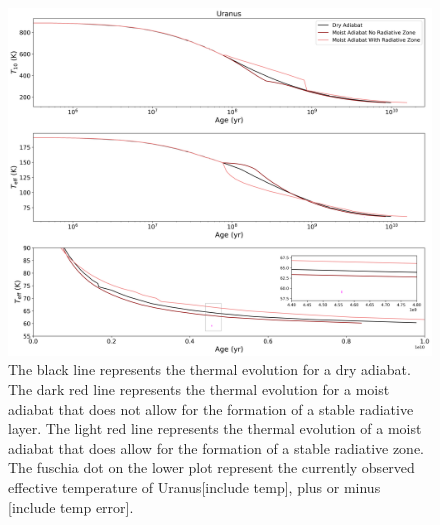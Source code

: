 \documentclass[11pt]{ucscthesisbs}
\begin{document}
\begin{figure}[ht]
 \centerline{
  \includegraphics[scale=0.5]{figures/dry_moist_radiative_u_cooling_curves_adiabat_comparisons.png}
 }
\caption[Thermal Evolution Curves for Uranus - Adiabat Comparisons]
{The black line represents the thermal evolution for a dry adiabat. The dark red line represents the thermal evolution for a moist adiabat that does not allow for the formation of a stable radiative layer. The light red line represents the thermal evolution of a moist adiabat that does allow for the formation of a stable radiative zone. The fuschia dot on the lower plot represent the currently observed effective temperature of Uranus[include temp], plus or minus [include temp error]. }
\label{fig:evolve_adiabats}
\end{figure}
\end{document}
